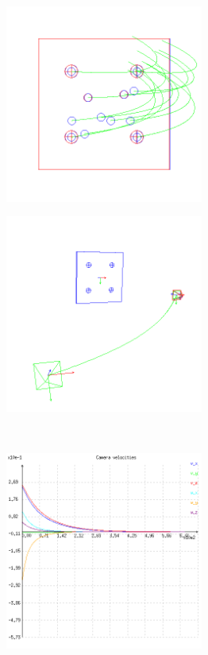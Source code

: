 \begin{figure}[ht!]
\begin{mdframed}[linecolor=black!30,backgroundcolor=black!5]
  \centering
  \begin{subfigure}{.48\linewidth}
    \centering
    \includegraphics[width=65mm]{figures/plots/ex5pimage.png}
    \caption{}
    \label{fig:ex5pimage}
  \end{subfigure}
  \begin{subfigure}{.48\linewidth}
    \centering
    \includegraphics[width=65mm]{figures/plots/ex5pscene.png}
    \caption{}
    \label{fig:ex5pscene}
  \end{subfigure}
  \\
  \begin{subfigure}{.48\linewidth}
    \centering
    \includegraphics[width=65mm]{figures/plots/ex5pvelocity.png}

\end{subfigure}
\end{mdframed}
\end{figure}
